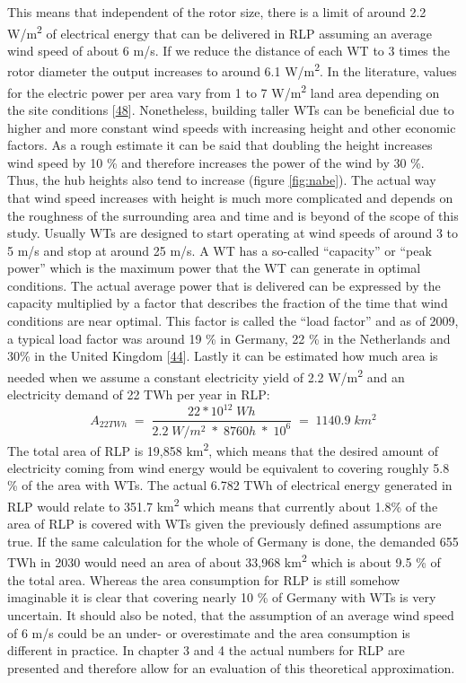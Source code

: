 \documentclass[a4paper,11pt]{article}
\begin{document}
This means that independent of the rotor size, there is a limit of around 2.2 W/m\textsuperscript{2} of electrical energy that can be delivered in RLP assuming an average wind speed of about 6 m/s. If we reduce the distance of each WT to 3 times the rotor diameter the output increases to around 6.1 W/m\textsuperscript{2}. In the literature, values for the electric power per area vary from 1 to 7 W/m\textsuperscript{2} land area depending on the site conditions {[}\protect\hyperlink{ref-SvenLinow.2020}{48}{]}. Nonetheless, building taller WTs can be beneficial due to higher and more constant wind speeds with increasing height and other economic factors. As a rough estimate it can be said that doubling the height increases wind speed by 10 \% and therefore increases the power of the wind by 30 \%. Thus, the hub heights also tend to increase (figure \ref{fig:nabe}). The actual way that wind speed increases with height is much more complicated and depends on the roughness of the surrounding area and time and is beyond of the scope of this study. Usually WTs are designed to start operating at wind speeds of around 3 to 5 m/s and stop at around 25 m/s. A WT has a so-called ``capacity'' or ``peak power'' which is the maximum power that the WT can generate in optimal conditions. The actual average power that is delivered can be expressed by the capacity multiplied by a factor that describes the fraction of the time that wind conditions are near optimal. This factor is called the ``load factor'' and as of 2009, a typical load factor was around 19 \% in Germany, 22 \% in the Netherlands and 30\% in the United Kingdom {[}\protect\hyperlink{ref-DavidJCMacKay.2009}{44}{]}. Lastly it can be estimated how much area is needed when we assume a constant electricity yield of 2.2 W/m\textsuperscript{2} and an electricity demand of 22 TWh per year in RLP:
\begin{equation}
A_{22TWh}\;=\;\frac{22 * 10^{12}\; Wh}{2.2\;W/m^2\; *\; 8760h\; *\; 10^6}\;=\;1140.9\;km^2
\end{equation}
The total area of RLP is 19,858 km\textsuperscript{2}, which means that the desired amount of electricity coming from wind energy would be equivalent to covering roughly 5.8 \% of the area with WTs. The actual 6.782 TWh of electrical energy generated in RLP would relate to 351.7 km\textsuperscript{2} which means that currently about 1.8\% of the area of RLP is covered with WTs given the previously defined assumptions are true. If the same calculation for the whole of Germany is done, the demanded 655 TWh in 2030 would need an area of about 33,968 km\textsuperscript{2} which is about 9.5 \% of the total area. Whereas the area consumption for RLP is still somehow imaginable it is clear that covering nearly 10 \% of Germany with WTs is very uncertain. It should also be noted, that the assumption of an average wind speed of 6 m/s could be an under- or overestimate and the area consumption is different in practice. In chapter 3 and 4 the actual numbers for RLP are presented and therefore allow for an evaluation of this theoretical approximation.
\end{document}

